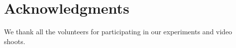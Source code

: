 \documentclass{sigchi}
\begin{document}
\section{Acknowledgments}
We thank all the volunteers for participating in our experiments and video shoots.




\end{document}
